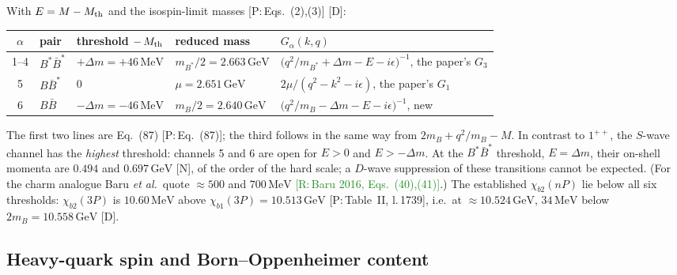 \documentclass[11pt,a4paper]{article}
\newcommand{\tagP}[1]{\textcolor{blue!65!black}{\textsf{\small[P:\,#1]}}}
\newcommand{\tagR}[1]{\textcolor{ForestGreen}{\textsf{\small[R:\,#1]}}}
\newcommand{\tagD}{\textcolor{orange!85!black}{\textsf{\small[D]}}}
\newcommand{\tagN}{\textcolor{red!70!black}{\textsf{\small[N]}}}
\newcommand{\BB}{B\bar B}
\newcommand{\BBst}{B\bar B^*}
\newcommand{\BstBst}{B^*\bar B^*}
\newcommand{\Mth}{M_{\rm th}}
\newcommand{\GeV}{\,\mathrm{GeV}}
\newcommand{\MeV}{\,\mathrm{MeV}}
\begin{document}
With $E=M-\Mth$ and the isospin-limit masses \tagP{Eqs.~(2),(3)} \tagD:
\begin{center}
\small
\begin{tabular}{cllll}
\toprule
$\alpha$ & pair & threshold $-\,\Mth$ & reduced mass & $G_\alpha(k,q)$\\
\midrule
1--4 & $\BstBst$ & $+\Delta m=+46\MeV$ & $m_{B^*}/2=2.663\GeV$ & $\big(q^2/m_{B^*}+\Delta m-E-i\epsilon\big)^{-1}$, the paper's $G_3$\\
5 & $\BBst$ & $0$ & $\mu=2.651\GeV$ & $2\mu/(q^2-k^2-i\epsilon)$, the paper's $G_1$\\
6 & $\BB$ & $-\Delta m=-46\MeV$ & $m_B/2=2.640\GeV$ & $\big(q^2/m_B-\Delta m-E-i\epsilon\big)^{-1}$, new\\
\bottomrule
\end{tabular}
\end{center}
The first two lines are Eq.~(87) \tagP{Eq.~(87)}; the third follows in the same way from $2m_B+q^2/m_B-M$. In contrast to $1^{++}$, the $S$-wave channel has the \emph{highest} threshold: channels 5 and 6 are open for $E>0$ and $E>-\Delta m$. At the $\BstBst$ threshold, $E=\Delta m$, their on-shell momenta are $0.494$ and $0.697\GeV$ \tagN, of the order of the hard scale; a $D$-wave suppression of these transitions cannot be expected. (For the charm analogue Baru \emph{et al.}\ quote $\approx500$ and $700\MeV$ \tagR{Baru 2016, Eqs.~(40),(41)}.) The established $\chi_{b2}(nP)$ lie below all six thresholds: $\chi_{b2}(3P)$ is $10.60\MeV$ above $\chi_{b1}(3P)=10.513\GeV$ \tagP{Table~II, l.\,1739}, i.e.\ at $\approx10.524\GeV$, $34\MeV$ below $2m_B=10.558\GeV$ \tagD.

\subsection{Heavy-quark spin and Born--Oppenheimer content}
\label{sec:hqss-content}
\end{document}
